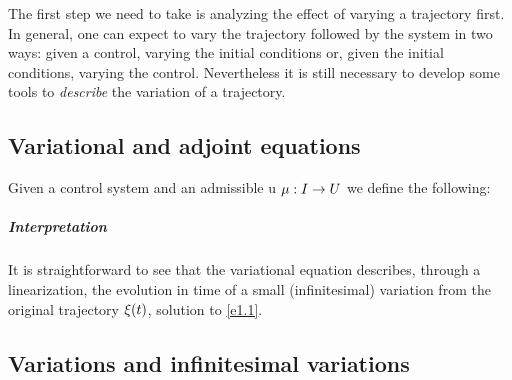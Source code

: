 The first step we need to take is analyzing the effect of varying a trajectory first. In general, one can expect to vary the trajectory followed by the system in two ways: given a control, varying the initial conditions or, given the initial conditions, varying the control. Nevertheless it is still necessary to develop some tools to \textit{describe} the variation of a trajectory. 

\subsection{Variational and adjoint equations}

Given a control system \controlSystem\space and an admissible u $\mu:I\rightarrow U$ we define the following:

\subparagraph{Interpretation}It is straightforward to see that the variational equation describes, through a linearization,  the evolution in time of a small (infinitesimal) variation from the original trajectory $\xi (t)$, solution to \eqref{e1.1}.\\

\subsection{Variations and infinitesimal variations}

